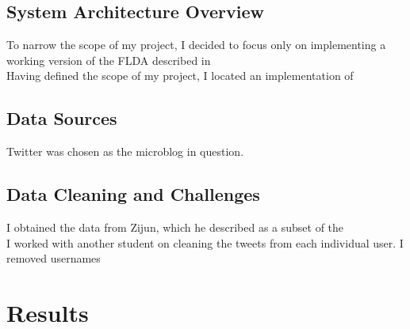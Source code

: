 \documentclass[a4paper]{article}
\begin{document}
\subsection{System Architecture Overview}
To narrow the scope of my project, I decided to focus only on implementing a working version of the FLDA described in \\
Having defined the scope of my project, I 
located an implementation of  \cite{TODO}

\subsection{Data Sources}
Twitter was chosen as the microblog in question.

\subsection{Data Cleaning and Challenges}
I obtained the data from Zijun, which he described as a subset of the \\
I worked with another student on cleaning the tweets from each individual user. I removed usernames \\


\section{Results}

\end{document}
